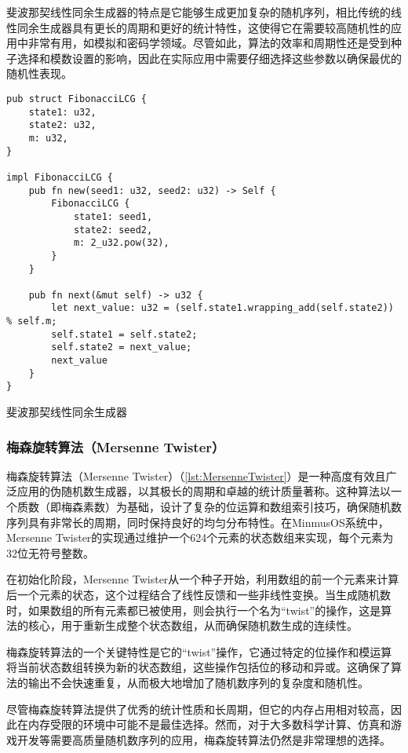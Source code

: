 斐波那契线性同余生成器的特点是它能够生成更加复杂的随机序列，相比传统的线性同余生成器具有更长的周期和更好的统计特性，这使得它在需要较高随机性的应用中非常有用，如模拟和密码学领域。尽管如此，算法的效率和周期性还是受到种子选择和模数设置的影响，因此在实际应用中需要仔细选择这些参数以确保最优的随机性表现。

\begin{listing}[htbp]
    \begin{verbatim}
pub struct FibonacciLCG {
    state1: u32,
    state2: u32,
    m: u32,
}

impl FibonacciLCG {
    pub fn new(seed1: u32, seed2: u32) -> Self {
        FibonacciLCG {
            state1: seed1,
            state2: seed2,
            m: 2_u32.pow(32),
        }
    }

    pub fn next(&mut self) -> u32 {
        let next_value: u32 = (self.state1.wrapping_add(self.state2)) % self.m;
        self.state1 = self.state2;
        self.state2 = next_value;
        next_value
    }
}
    \end{verbatim}
    \caption{斐波那契线性同余生成器}\label{lst:FibonacciLinearCongruentialGenerator}
\end{listing}

\subsubsection{梅森旋转算法（Mersenne Twister）}

梅森旋转算法（Mersenne Twister）（\cref{lst:MersenneTwister}）是一种高度有效且广泛应用的伪随机数生成器，以其极长的周期和卓越的统计质量著称。这种算法以一个质数（即梅森素数）为基础，设计了复杂的位运算和数组索引技巧，确保随机数序列具有非常长的周期，同时保持良好的均匀分布特性。在MinmusOS系统中，Mersenne Twister的实现通过维护一个624个元素的状态数组来实现，每个元素为32位无符号整数。

在初始化阶段，Mersenne Twister从一个种子开始，利用数组的前一个元素来计算后一个元素的状态，这个过程结合了线性反馈和一些非线性变换。当生成随机数时，如果数组的所有元素都已被使用，则会执行一个名为“twist”的操作，这是算法的核心，用于重新生成整个状态数组，从而确保随机数生成的连续性。

梅森旋转算法的一个关键特性是它的“twist”操作，它通过特定的位操作和模运算将当前状态数组转换为新的状态数组，这些操作包括位的移动和异或。这确保了算法的输出不会快速重复，从而极大地增加了随机数序列的复杂度和随机性。

尽管梅森旋转算法提供了优秀的统计性质和长周期，但它的内存占用相对较高，因此在内存受限的环境中可能不是最佳选择。然而，对于大多数科学计算、仿真和游戏开发等需要高质量随机数序列的应用，梅森旋转算法仍然是非常理想的选择。

